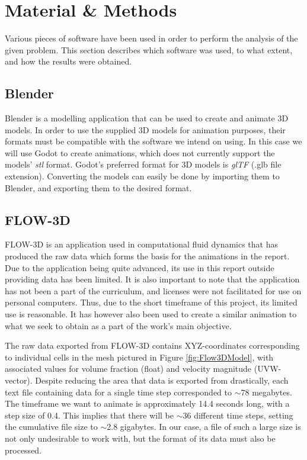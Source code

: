\documentclass[a4paper,11pt]{extarticle}
\begin{document}
\section{Material \& Methods}
Various pieces of software have been used in order to perform the analysis of the given problem. This section describes which software was used, to what extent, and how the results were obtained.

\subsection{Blender}\label{sec:Blender}
Blender \citep{blender} is a modelling application that can be used to create and animate 3D models. In order to use the supplied 3D models for animation purposes, their formats must be compatible with the software we intend on using. In this case we will use Godot to create animations, which does not currently support the models' \textit{stl} format. Godot's preferred format for 3D models is \textit{glTF} (.glb file extension). Converting the models can easily be done by importing them to Blender, and exporting them to the desired format.

\subsection{FLOW-3D}\label{sec:Flow3D}
FLOW-3D \citep{Flow3D} is an application used in computational fluid dynamics that has produced the raw data which forms the basis for the animations in the report. Due to the application being quite advanced, its use in this report outside providing data has been limited. It is also important to note that the application has not been a part of the curriculum, and licenses were not facilitated for use on personal computers. Thus, due to the short timeframe of this project, its limited use is reasonable. It has however also been used to create a similar animation to what we seek to obtain as a part of the work's main objective.

The raw data exported from FLOW-3D contains XYZ-coordinates corresponding to individual cells in the mesh pictured in Figure \ref{fig:Flow3DModel}, with associated values for volume fraction (float) and velocity magnitude (UVW-vector). Despite reducing the area that data is exported from drastically, each text file containing data for a single time step corresponded to $\sim$78 megabytes. The timeframe we want to animate is approximately 14.4 seconds long, with a step size of 0.4. This implies that there will be $\sim$36 different time steps, setting the cumulative file size to $\sim$2.8 gigabytes. In our case, a file of such a large size is not only undesirable to work with, but the format of its data must also be processed.
\end{document}
